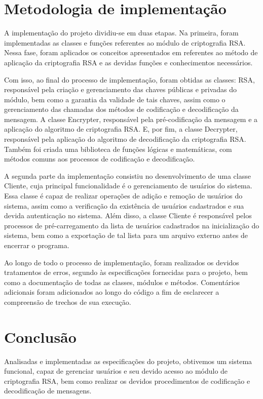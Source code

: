 \documentclass[a4paper, 12pt]{article}
\begin{document}
	\section{Metodologia de implementação}
		\vspace{0,5 cm}
		\par A implementação do projeto dividiu-se em duas etapas. Na primeira, foram implementadas as classes e funções referentes ao módulo de criptografia RSA. Nessa fase, foram aplicados os conceitos apresentados em \cite{evaristo} referentes ao método de aplicação da criptografia RSA e as devidas funções e conhecimentos necessários. 
		\\
		\par Com isso, ao final do processo de implementação, foram obtidas as classes: RSA, responsável pela criação e gerenciamento das chaves públicas e privadas do módulo, bem como a garantia da validade de tais chaves, assim como o gerenciamento das chamadas dos métodos de codificação e decodificação da mensagem. A classe Encrypter, responsável pela pré-codificação da mensagem e a aplicação do algoritmo de criptografia RSA. E, por fim, a classe Decrypter, responsável pela aplicação do algoritmo de decodificação da criptografia RSA. Também foi criada uma biblioteca de funções lógicas e matemáticas, com métodos comuns aos processos de codificação e decodificação.
		\\
		\par A segunda parte da implementação consistiu no desenvolvimento de uma classe Cliente, cuja principal funcionalidade é o gerenciamento de usuários do sistema. Essa classe é capaz de realizar operações de adição e remoção de usuários do sistema, assim como a verificação da existência de usuários cadastrados e sua devida autenticação no sistema. Além disso, a classe Cliente é responsável pelos processos de pré-carregamento da lista de usuários cadastrados na inicialização do sistema, bem como a exportação de tal lista para um arquivo externo antes de encerrar o programa.
		\\
		\par Ao longo de todo o processo de implementação, foram realizados os devidos tratamentos de erros, segundo às especificações fornecidas para o projeto, bem como a documentação de todas as classes, módulos e métodos. Comentários adicionais foram adicionados ao longo do código a fim de esclarecer a compreensão de trechos de sua execução.
	
	\newpage
	\section{Conclusão}
		\par Analisadas e implementadas as especificações do projeto, obtivemos um sistema funcional, capaz de gerenciar usuários e seu devido acesso ao módulo de criptografia RSA, bem como realizar os devidos procedimentos de codificação e decodificação de mensagens.
	
	\newpage
	
	

 
\end{document}
